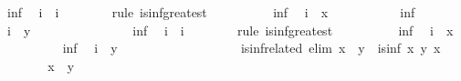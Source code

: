 \begin{isabellebody}
\ inf{\isacharprime}\ \isamarkupfalse%
\ {\isachardoublequoteopen}i\ {\isasymsqsubseteq}\ i{\isacharprime}{\isachardoublequoteclose}\isanewline
\ \ \ \ \ \ \isamarkupfalse%
\ {\isacharparenleft}rule\ is{\isacharunderscore}inf{\isacharunderscore}greatest{\isacharparenright}\isanewline
\ \ \ \ \ \ \ \ \isamarkupfalse%
\ inf\ \isamarkupfalse%
\ {\isachardoublequoteopen}i\ {\isasymsqsubseteq}\ x{\isachardoublequoteclose}\ \isacommand{{\isachardot}{\isachardot}}\isamarkupfalse%
\isanewline
\ \ \ \ \ \ \ \ \isamarkupfalse%
\ inf\ \isamarkupfalse%
\ {\isachardoublequoteopen}i\ {\isasymsqsubseteq}\ y{\isachardoublequoteclose}\ \isacommand{{\isachardot}{\isachardot}}\isamarkupfalse%
\isanewline
\ \ \ \ \ \ \isamarkupfalse%
\isanewline
\ \ \ \ \ \ \isamarkupfalse%
\ inf\ \isamarkupfalse%
\ {\isachardoublequoteopen}i{\isacharprime}\ {\isasymsqsubseteq}\ i{\isachardoublequoteclose}\isanewline
\ \ \ \ \ \ \isamarkupfalse%
\ {\isacharparenleft}rule\ is{\isacharunderscore}inf{\isacharunderscore}greatest{\isacharparenright}\isanewline
\ \ \ \ \ \ \ \ \isamarkupfalse%
\ inf{\isacharprime}\ \isamarkupfalse%
\ {\isachardoublequoteopen}i{\isacharprime}\ {\isasymsqsubseteq}\ x{\isachardoublequoteclose}\ \isacommand{{\isachardot}{\isachardot}}\isamarkupfalse%
\isanewline
\ \ \ \ \ \ \ \ \isamarkupfalse%
\ inf{\isacharprime}\ \isamarkupfalse%
\ {\isachardoublequoteopen}i{\isacharprime}\ {\isasymsqsubseteq}\ y{\isachardoublequoteclose}\ \isacommand{{\isachardot}{\isachardot}}\isamarkupfalse%
\isanewline
\ \ \ \ \ \ \isamarkupfalse%
\isanewline
\ \ \ \ \isamarkupfalse%
\isanewline
\ \ \isamarkupfalse%
%
\endisatagproof
{\isafoldproof}%
%
\isadelimproof
\isanewline
%
\endisadelimproof
%
\isadeliminvisible
\isanewline
\ \ %
\endisadeliminvisible
%
\isataginvisible
{}\isamarkupfalse%
\ is{\isacharunderscore}inf{\isacharunderscore}related\ {\isacharbrackleft}elim{\isacharquery}{\isacharbrackright}{\isacharcolon}\ {\isachardoublequoteopen}x\ {\isasymsqsubseteq}\ y\ {\isasymLongrightarrow}\ is{\isacharunderscore}inf\ x\ y\ x{\isachardoublequoteclose}\isanewline
\ \ \isamarkupfalse%
\ {\isacharminus}\isanewline
\ \ \ \ \isamarkupfalse%
\ {\isachardoublequoteopen}x\ {\isasymsqsubseteq}\ y{\isachardoublequoteclose}\isanewline
\ \ \ \ \isamarkupfalse%

\end{isabellebody}
